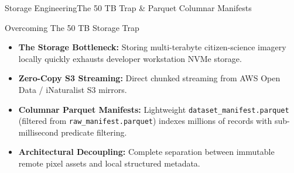 \begin{frame}{Storage Engineering}{The 50 TB Trap \& Parquet Columnar Manifests}
    \begin{block}{Overcoming The 50 TB Storage Trap}
        \begin{itemize}\small
            \item \textbf{The Storage Bottleneck:} Storing multi-terabyte citizen-science imagery locally quickly exhausts developer workstation NVMe storage.
            \item \textbf{Zero-Copy S3 Streaming:} Direct chunked streaming from AWS Open Data / iNaturalist S3 mirrors.
            \item \textbf{Columnar Parquet Manifests:} Lightweight \texttt{dataset\_manifest.parquet} (filtered from \texttt{raw\_manifest.parquet}) indexes millions of records with sub-millisecond predicate filtering.
            \item \textbf{Architectural Decoupling:} Complete separation between immutable remote pixel assets and local structured metadata.
        \end{itemize}
    \end{block}


\end{frame}

